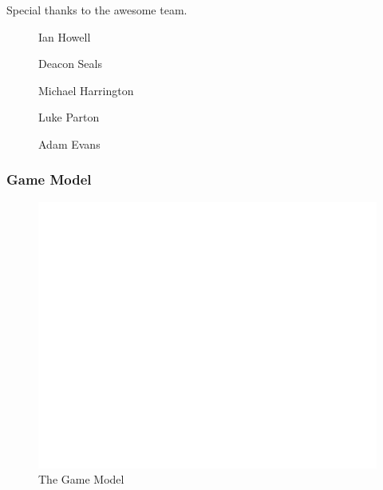 \documentclass[xclolor=dvipsnames]{beamer}            %
\begin{document}
\begin{darkframes}
\begin{frame}
        Special thanks to the awesome team.

        \begin{center}
            \begin{description}
                \item[\faUser] Ian Howell
                \item[\faUser] Deacon Seals
                \item[\faUser] Michael Harrington
                \item[\faUser] Luke Parton
                \item[\faUser] Adam Evans
            \end{description}
        \end{center}

    \end{frame}


    \begin{frame}
        \frametitle{Game Model}

        \begin{figure}[!ht]
            \centering
            \includegraphics[width=.75\textwidth]{./assets/model.png}
            \caption{The Game Model}
        \end{figure}

    \end{frame}
\end{darkframes}
\end{document}
